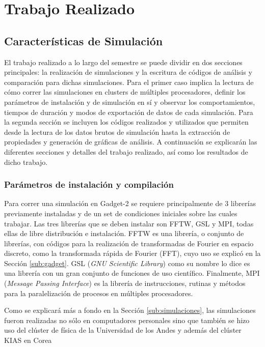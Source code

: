 \chapter{Trabajo Realizado}
\label{chap:trabajo}

\section{Características de Simulación}
El trabajo realizado a lo largo del semestre se puede dividir en dos secciones principales: la realización de simulaciones y la escritura de códigos de análisis y comparación para dichas simulaciones. Para el primer caso implica la lectura de cómo correr las simulaciones en clusters de múltiples procesadores, definir los parámetros de instalación y de simulación en sí y observar los comportamientos, tiempos de duración y modos de exportación de datos de cada simulación. Para la segunda sección se incluyen los códigos realizados y utilizados que permiten desde la lectura de los datos brutos de simulación hasta la extracción de propiedades y generación de gráficas de análisis. A continuación se explicarán las diferentes secciones y detalles del trabajo realizado, así como los resultados de dicho trabajo.

\subsection{Parámetros de instalación y compilación}
Para correr una simulación en Gadget-2 se requiere principalmente de 3 librerías previamente instaladas y de un set de condiciones iniciales sobre las cuales trabajar. Las tres librerías que se deben instalar son FFTW, GSL y MPI, todas ellas de libre distribución e instalación. FFTW es una librería, o conjunto de librerías, con códigos para la realización de transformadas de Fourier en espacio discreto, como la transformada rápida de Fourier (FFT), cuyo uso se explicó en la Sección \ref{sub:gadget}. GSL (\textit{GNU Scientific Library}) como su nombre lo dice es una librería con un gran conjunto de funciones de uso científico. Finalmente, MPI (\textit{Message Passing Interface}) es la librería de instrucciones, rutinas y métodos para la paralelización de procesos en múltiples procesadores. 

Como se explicará más a fondo en la Sección \ref{sub:simulaciones}, las simulaciones fueron realizadas no sólo en computadores personales sino que también se hizo uso del clúster de física de la Universidad de los Andes y además del clúster KIAS en Corea 
